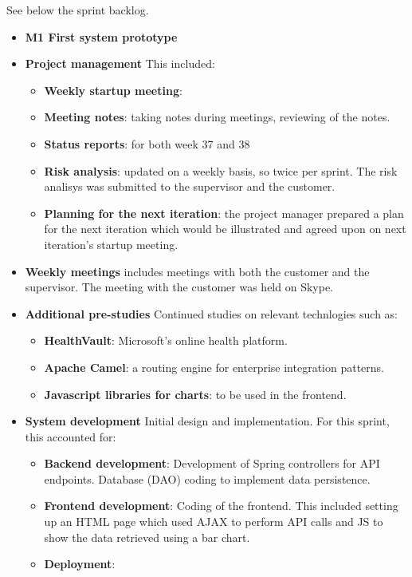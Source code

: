 See below the sprint backlog.
\begin{itemize}
	\item \textbf{M1 First system prototype}
	\item \textbf{Project management}\newline
	This included:
	\begin{itemize}
		\item \textbf{Weekly startup meeting}: 
		\item \textbf{Meeting notes}:
			taking notes during meetings, reviewing of the notes.
		\item \textbf{Status reports}:
			for both week 37 and 38
		\item \textbf{Risk analysis}:
			updated on a weekly basis, so twice per sprint.
			The risk analisys was submitted to the supervisor and the customer.
		\item \textbf{Planning for the next iteration}:
			the project manager prepared a plan for the next iteration
			which would be illustrated and agreed upon on next iteration's startup meeting.
	\end{itemize}
	\item \textbf{Weekly meetings}
		includes meetings with both the customer and the supervisor.
		The meeting with the customer was held on Skype.
	\item \textbf{Additional pre-studies}
		Continued studies on relevant technlogies such as:
	\begin{itemize}
		\item \textbf{HealthVault}: Microsoft's online health platform.
		\item \textbf{Apache Camel}: a routing engine for enterprise integration patterns.
		\item \textbf{Javascript libraries for charts}: to be used in the frontend.
	\end{itemize}
	\item \textbf{System development}
		Initial design and implementation. For this sprint, this accounted for:
	\begin{itemize}
		\item \textbf{Backend development}:
			Development of Spring controllers for API endpoints. Database (DAO) coding to
			implement data persistence.
		\item \textbf{Frontend development}:
			Coding of the frontend. This included setting up an HTML page which used
			AJAX to perform API calls and JS to show the data retrieved using a bar chart.
		\item \textbf{Deployment}:

\end{itemize}
\end{itemize}
